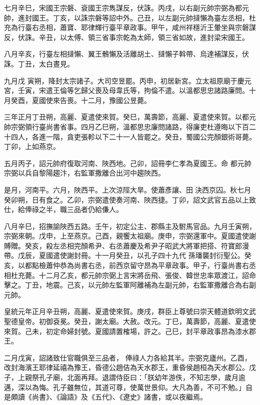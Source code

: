 \begin{pinyinscope}
 七月辛巳，宋國王宗磐、袞國王宗雋謀反，伏誅。丙戌，以右副元帥宗弼為都元帥，進封國王。丁亥，以誅宗磐等詔中外。己丑，以左副元帥撻懶為臺左丞相，杜充為行臺右丞相，蕭寶、耶律輝行臺平章政事。甲午，咸州祥穩沂王暈坐與宗磐謀反，伏誅。辛丑，以太傅、領三省事宗乾為太師，領三省如故，進封梁宋國王。



 八月辛亥，行臺左相撻懶、翼王鶻懶及活離胡土、撻懶子斡帶、烏達補謀反，伏誅。丁丑，太白晝見。



 九月戊
 寅朔，降封太宗諸子。大司空昱罷。丙申，初居新宮。立太祖原廟于慶元宮，壬寅，宋遣王倫等乞歸父喪及母韋氏等，拘倫不遣。以溫都思忠諸路廉問。十月癸酉，夏國使來告喪。十二月，豫國公昱薨。



 三年正月丁丑朔，高麗、夏遣使來賀。癸巳，萬壽節，高麗、夏遣使來賀。以都元帥宗弼領行臺尚書省事。四月乙巳朔，溫都思忠廉問諸路，得廉吏杜遵晦以下百二十四人，各進一階，貪吏張軫以下二十一人皆罷之。癸丑，蜀國公完顏銀術哥薨。丁卯，上如燕京。



 五月丙子，詔元帥府復取河南、陜西地。己卯，詔冊李仁孝為夏國王。命
 都元帥宗弼以兵自黎陽趨汴，右監軍撒離合出河中趨陜西。



 是月，河南平。六月，陜西平。上次涼陘大旱。使蕭彥讓、田決西京囚。秋七月癸卯朔，日有食之。乙卯，宗弼遣使奏河南、陜西捷。丁卯，詔文武官五品以上致仕，給俸祿之半，職三品者仍給傔人。



 八月辛巳，招撫諭陜西五路。壬午，初定公主、郡縣主及駙馬官品。九月壬寅朔，宗弼來朝。戊申，上至燕京。己酉，親饗太祖廟。庚申，宗弼還軍中。夏國遣使謝賻贈。癸亥，殺左丞相完顏希尹、右丞蕭慶及希尹子昭武大將軍把搭、符寶郎漫帶。戊辰，夏國遣使謝封冊。十一月癸丑，以孔子四十九代
 孫璠襲封衍聖公。癸亥，以都點檢蕭仲恭為尚書右丞，前西京留守昂為平章政事。甲子，行臺尚書右丞相杜充薨。十二月乙亥，都元帥宗弼上言宋將岳飛、張俊、韓世忠率眾渡江，詔命擊之。丁丑，地震。己亥，以元帥左監軍阿離補為左副元帥，右監軍撒離合為右副元帥。



 皇統元年正月辛丑朔，高麗、夏遣使來賀。庚戌，群臣上尊號曰崇天體道欽明文武聖德皇帝。初御袞冕。癸丑，謝太廟。大赦。改元。丁巳，萬壽節，高麗、夏遣使來賀。己未，初定命婦封號。夏國請置榷場，許之。己巳，封平章政事昂為漆水郡王。



 二月戊寅，詔諸致仕官職俱至三品者，
 俸祿人力各給其半。宗弼克廬州。乙酉，改封海濱王耶律延禧為豫王，昏德公趙佶為天水郡王，重昏侯趙桓為天水郡公。戊子，上親祭孔子廟，北面再拜。退謂侍臣曰：「朕幼年游佚，不知志學，歲月逾邁，深以為悔。孔子雖無位，其道可尊，使萬世景仰。大凡為善，不可不勉。」自是頗讀《尚書》、《論語》及《五代》、《遼史》諸書，或以夜繼焉。




\end{pinyinscope}
